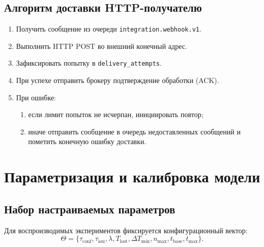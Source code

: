 \subsection{Алгоритм доставки HTTP-получателю}

\begin{enumerate}
    \item Получить сообщение из очереди \texttt{integration.webhook.v1}.
    \item Выполнить HTTP POST во внешний конечный адрес.
    \item Зафиксировать попытку в \texttt{delivery\_attempts}.
        \item При успехе отправить брокеру подтверждение обработки (ACK).
    \item При ошибке:
    \begin{enumerate}
        \item если лимит попыток не исчерпан, инициировать повтор;
        \item иначе отправить сообщение в очередь недоставленных сообщений и пометить конечную ошибку доставки.
    \end{enumerate}
\end{enumerate}

\section{Параметризация и калибровка модели}

\subsection{Набор настраиваемых параметров}

Для воспроизводимых экспериментов фиксируется конфигурационный вектор:
\begin{equation}
\Theta = \{\tau_{\text{conf}}, \tau_{\text{iou}}, \lambda, T_{\text{lost}}, \Delta T_{\min}, n_{\max}, t_{\text{base}}, t_{\max}\}.
\end{equation}
\where
{}

